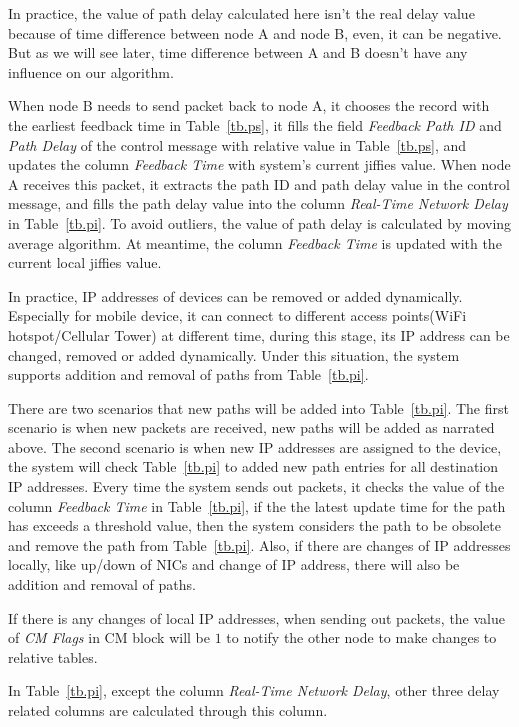 In practice, the value of path delay calculated here isn\textquoteright t the real delay value because of time difference between node A and node B, even, it can be negative. But as we will see later, time difference between A and B doesn\textquoteright t have any influence on our algorithm.

When node B needs to send packet back to node A, it chooses the record with the earliest feedback time in Table~\ref{tb.ps}, it fills the field \emph{Feedback Path ID} and \emph{Path Delay} of the control message with relative value in Table~\ref{tb.ps}, and updates the column \emph{Feedback Time} with system\textquoteright s current jiffies value. When node A receives this packet, it extracts the path ID and path delay value in the control message, and fills the path delay value into the column \emph{Real-Time Network Delay} in Table~\ref{tb.pi}. To avoid outliers, the value of path delay is calculated by moving average algorithm. At meantime, the column \emph{Feedback Time} is updated with the current local jiffies value.

In practice, IP addresses of devices can be removed or added dynamically. Especially for mobile device, it can connect to different access points(WiFi hotspot/Cellular Tower) at different time, during this stage, its IP address can be changed, removed or added dynamically. Under this situation, the system supports addition and removal of paths from Table~\ref{tb.pi}.

There are two scenarios that new paths will be added into Table~\ref{tb.pi}. The first scenario is when new packets are received, new paths will be added as narrated above. The second scenario is when new IP addresses are assigned to the device, the system will check Table~\ref{tb.pi} to added new path entries for all destination IP addresses. Every time the system sends out packets, it checks the value of the column \emph{Feedback Time} in Table~\ref{tb.pi}, if the the latest update time for the path has exceeds a threshold value, then the system considers the path to be obsolete and remove the path from Table~\ref{tb.pi}. Also, if there are changes of IP addresses locally, like up/down of NICs and change of IP address, there will also be addition and removal of paths.

If there is any changes of local IP addresses, when sending out packets, the value of \emph{CM Flags} in CM block will be $1$ to notify the other node to make changes to relative tables.

In Table~\ref{tb.pi}, except the column \emph{Real-Time Network Delay}, other three delay related columns are calculated through this column.

